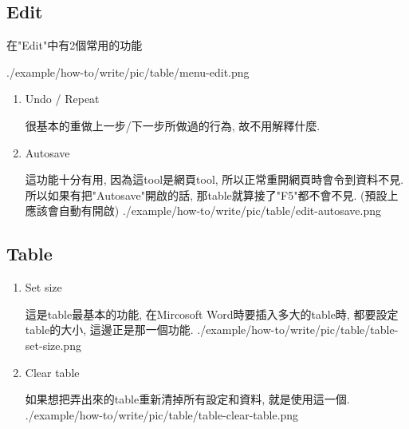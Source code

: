 \newpage
\subsection{Edit}

  在"Edit"中有2個常用的功能

  \InsertCenterImage
    {./example/how-to/write/pic/table/menu-edit.png}

  \begin{enumerate}

  \item
  {
    Undo / Repeat

    很基本的重做上一步/下一步所做過的行為, 故不用解釋什麼.
  } %

  \item
  {
    Autosave

    這功能十分有用, 因為這tool是網頁tool, 所以正常重開網頁時會令到資料不見. 所以如果有把"Autosave"開啟的話, 那table就算接了"F5"都不會不見. (預設上應該會自動有開啟)
    \InsertCenterImage
      {./example/how-to/write/pic/table/edit-autosave.png}
  } %

  \end{enumerate}

\newpage
\subsection{Table}

  \begin{enumerate}

  \item
  {
    Set size

    這是table最基本的功能, 在Mircosoft Word時要插入多大的table時, 都要設定table的大小, 這邊正是那一個功能.
    \InsertCenterImage
      {./example/how-to/write/pic/table/table-set-size.png}
  } %

  \item
  {
    Clear table

    如果想把弄出來的table重新清掉所有設定和資料, 就是使用這一個.
    \InsertCenterImage
      {./example/how-to/write/pic/table/table-clear-table.png}
  } %

  \end{enumerate}

\newpage
